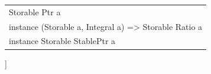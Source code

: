 \begin{haddockdesc}
\begin{tabular}{@{}l}
Storable Ptr a\\instance (Storable a, Integral a) => Storable Ratio a\\instance Storable StablePtr a
\end{tabular}]
\end{haddockdesc}